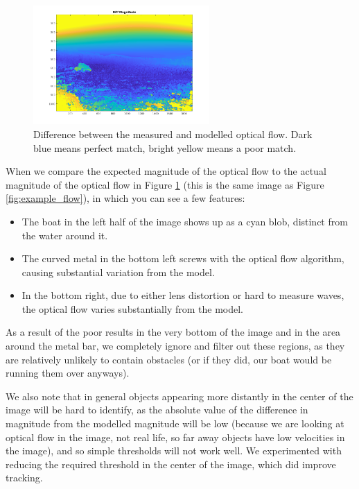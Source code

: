 \documentclass{article}
\begin{document}
\begin{figure}
\centering
\includegraphics[width=0.6\textwidth]{diff_magnitude}
\caption{Difference between the measured and modelled optical flow.
         Dark blue means perfect match, bright yellow means a poor match.}
\label{fig:diff_magnitude}
\end{figure}

When we compare the expected magnitude of the optical flow to the
actual magnitude of the optical flow in Figure \ref{fig:diff_magnitude}
(this is the same image as Figure \ref{fig:example_flow}),
in which you can see a few features:
\begin{itemize}
\item The boat in the left half of the image shows up as a cyan blob, distinct
      from the water around it.
\item The curved metal in the bottom left screws with the optical flow
      algorithm, causing substantial variation from the model.
\item In the bottom right, due to either lens distortion or hard to measure
      waves, the optical flow varies substantially from the model.
\end{itemize}

As a result of the poor results in the very bottom of the image and in the
area around the metal bar, we completely ignore and filter out these regions,
as they are relatively unlikely to contain obstacles (or if they did, our
boat would be running them over anyways).

We also note that in general objects appearing more distantly in the center of
the image will be hard to identify, as the absolute value of the difference
in magnitude from the modelled magnitude will be low (because we are looking
at optical flow in the image, not real life, so far away objects have
low velocities in the image), and so simple thresholds will not work well.
We experimented with reducing the required threshold in the center of the image,
which did improve tracking.
\end{document}
